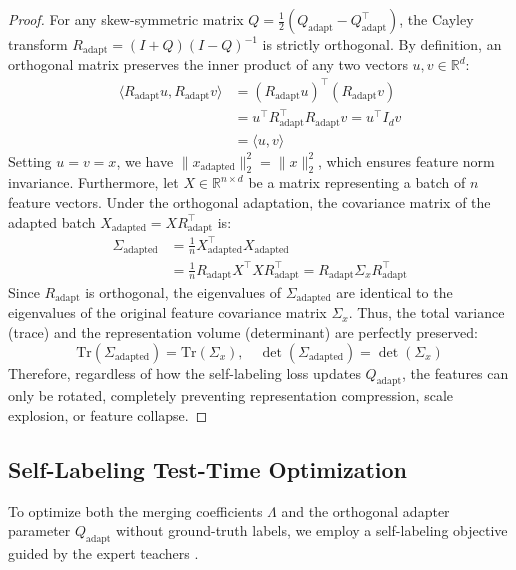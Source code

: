 \documentclass{article}
\theoremstyle{plain}
\theoremstyle{definition}
\theoremstyle{remark}
\begin{document}
\begin{proof}
For any skew-symmetric matrix $Q = \frac{1}{2}(Q_{\text{adapt}} - Q_{\text{adapt}}^\top)$, the Cayley transform $R_{\text{adapt}} = (I + Q)(I - Q)^{-1}$ is strictly orthogonal. By definition, an orthogonal matrix preserves the inner product of any two vectors $u, v \in \mathbb{R}^d$:
\begin{align}
\langle R_{\text{adapt}} u, R_{\text{adapt}} v \rangle &= (R_{\text{adapt}} u)^\top (R_{\text{adapt}} v) \nonumber \\
&= u^\top R_{\text{adapt}}^\top R_{\text{adapt}} v = u^\top I_d v \nonumber \\
&= \langle u, v \rangle
\end{align}
Setting $u = v = x$, we have $\|x_{\text{adapted}}\|_2^2 = \|x\|_2^2$, which ensures feature norm invariance. Furthermore, let $X \in \mathbb{R}^{n \times d}$ be a matrix representing a batch of $n$ feature vectors. Under the orthogonal adaptation, the covariance matrix of the adapted batch $X_{\text{adapted}} = X R_{\text{adapt}}^\top$ is:
\begin{align}
\Sigma_{\text{adapted}} &= \frac{1}{n} X_{\text{adapted}}^\top X_{\text{adapted}} \nonumber \\
&= \frac{1}{n} R_{\text{adapt}} X^\top X R_{\text{adapt}}^\top = R_{\text{adapt}} \Sigma_x R_{\text{adapt}}^\top
\end{align}
Since $R_{\text{adapt}}$ is orthogonal, the eigenvalues of $\Sigma_{\text{adapted}}$ are identical to the eigenvalues of the original feature covariance matrix $\Sigma_x$. Thus, the total variance (trace) and the representation volume (determinant) are perfectly preserved:
\begin{equation}
\text{Tr}(\Sigma_{\text{adapted}}) = \text{Tr}(\Sigma_x), \quad \det(\Sigma_{\text{adapted}}) = \det(\Sigma_x)
\end{equation}
Therefore, regardless of how the self-labeling loss updates $Q_{\text{adapt}}$, the features can only be rotated, completely preventing representation compression, scale explosion, or feature collapse.
\end{proof}

\subsection{Self-Labeling Test-Time Optimization}
To optimize both the merging coefficients $\Lambda$ and the orthogonal adapter parameter $Q_{\text{adapt}}$ without ground-truth labels, we employ a self-labeling objective guided by the expert teachers \cite{symerge2025symerge}. 
\end{document}
